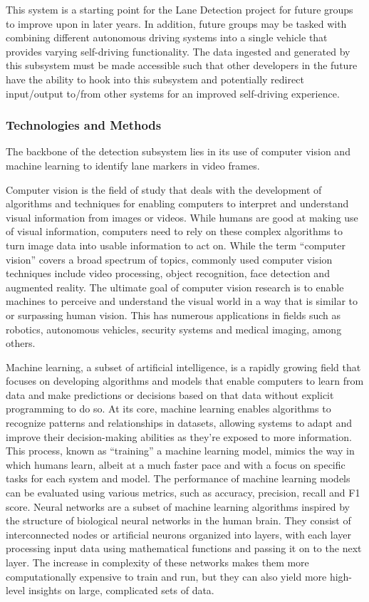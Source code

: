 \documentclass[titlepage]{article}
\begin{document}
\begin{itemize}
	      This system is a starting point for the Lane Detection project for future groups to improve upon in later years.
	      In addition, future groups may be tasked with combining different autonomous driving systems into a single vehicle that provides
	      varying self-driving functionality.
	      The data ingested and generated by this subsystem must be made accessible such that other developers in the future have the
	      ability to hook into this subsystem and potentially redirect input/output to/from other systems for an improved self-driving
	      experience.
\end{itemize}

\subsubsection{Technologies and Methods}

The backbone of the detection subsystem lies in its use of computer vision and machine learning to identify lane markers in video
frames.

Computer vision is the field of study that deals with the development of algorithms and techniques for enabling computers
to interpret and understand visual information from images or videos.
While humans are good at making use of visual information, computers need to rely on these complex algorithms to turn image
data into usable information to act on.
While the term ``computer vision'' covers a broad spectrum of topics, commonly used computer vision techniques include video
processing, object recognition, face detection and augmented reality.
The ultimate goal of computer vision research is to enable machines to perceive and understand the visual world in a way that
is similar to or surpassing human vision.
This has numerous applications in fields such as robotics, autonomous vehicles, security systems and medical imaging, among
others.

Machine learning, a subset of artificial intelligence, is a rapidly growing field that focuses on developing algorithms and
models that enable computers to learn from data and make predictions or decisions based on that data without explicit programming
to do so.
At its core, machine learning enables algorithms to recognize patterns and relationships in datasets, allowing systems to adapt
and improve their decision-making abilities as they're exposed to more information.
This process, known as ``training'' a machine learning model, mimics the way in which humans learn, albeit at a much faster pace
and with a focus on specific tasks for each system and model.
The performance of machine learning models can be evaluated using various metrics, such as accuracy, precision, recall and F1
score.
Neural networks are a subset of machine learning algorithms inspired by the structure of biological neural networks in the human
brain.
They consist of interconnected nodes or artificial neurons organized into layers, with each layer processing input data using
mathematical functions and passing it on to the next layer.
The increase in complexity of these networks makes them more computationally expensive to train and run, but they can also yield
more high-level insights on large, complicated sets of data.
\end{document}
